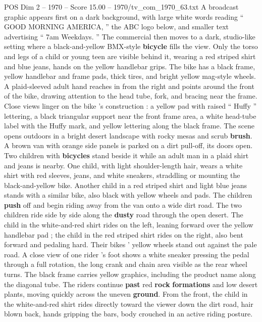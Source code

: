 \begin{textsample}{POS Dim 2 – 1970 – Score 15.00 – 1970/tv\_com\_1970\_63.txt}  \label{ex:f2_pos_074}
A broadcast graphic appears first on a dark background, with large white words reading “ GOOD MORNING AMERICA, ” the ABC logo below, and smaller text advertising “ 7am Weekdays. ” The commercial then moves to a dark, studio-like setting where a black-and-yellow BMX-style \textbf{bicycle} fills the view.
Only the torso and legs of a child or young teen are visible behind it, wearing a red striped shirt and blue jeans, hands on the yellow handlebar grips.
The bike has a black frame, yellow handlebar and frame pads, thick tires, and bright yellow mag-style wheels.
A plaid-sleeved adult hand reaches in from the right and points around the front of the bike, drawing attention to the head tube, fork, and bracing near the frame.
Close views linger on the bike ’s construction : a yellow pad with raised “ Huffy ” lettering, a black triangular support near the front frame area, a white head-tube label with the Huffy mark, and yellow lettering along the black frame.
The scene opens outdoors in a bright desert landscape with rocky mesas and scrub \textbf{brush}.
A brown van with orange side panels is parked on a dirt pull-off, its doors open.
Two children with \textbf{bicycles} stand beside it while an adult man in a plaid shirt and jeans is nearby.
One child, with light shoulder-length hair, wears a white shirt with red sleeves, jeans, and white sneakers, straddling or mounting the black-and-yellow bike.
Another child in a red striped shirt and light blue jeans stands with a similar bike, also black with yellow wheels and pads.
The children \textbf{push} off and begin riding away from the van onto a wide dirt road.
The two children ride side by side along the \textbf{dusty} road through the open desert.
The child in the white-and-red shirt rides on the left, leaning forward over the yellow handlebar pad ; the child in the red striped shirt rides on the right, also bent forward and pedaling hard.
Their bikes ’ yellow wheels stand out against the pale road.
A close view of one rider ’s foot shows a white sneaker pressing the pedal through a full rotation, the long crank and chain area visible as the rear wheel turns.
The black frame carries yellow graphics, including the product name along the diagonal tube.
The riders continue \textbf{past} red \textbf{rock} \textbf{formations} and low desert plants, moving quickly across the uneven \textbf{ground}.
From the front, the child in the white-and-red shirt rides directly toward the viewer down the dirt road, hair blown back, hands gripping the bars, body crouched in an active riding posture.

\end{textsample}
